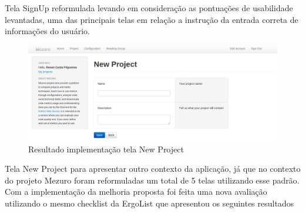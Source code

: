 Tela SignUp reformulada levando em consideração as pontuações de usabilidade levantadas, uma das principais telas em relação a instrução da entrada correta de informações do usuário.

\graphicspath{{figuras/}}
\begin{figure}[H]
\centering
\includegraphics[width=1.0\textwidth]{TelaNewProject}
\caption{Resultado implementação tela New Project}
\label{parallel-coordinate}
\end{figure}

Tela New Project para apresentar outro contexto da aplicação, já que no contexto do projeto Mezuro foram reformuladas um total de 5 telas utilizando esse padrão. Com a implementação da melhoria proposta foi feita uma nova avaliação utilizando o mesmo checklist da ErgoList que apresentou os seguintes resultados

